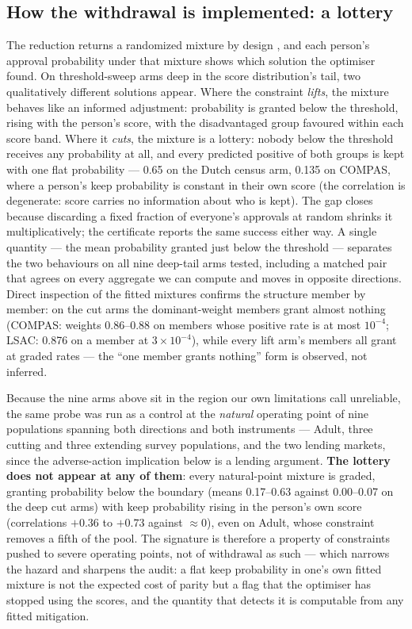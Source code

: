\documentclass[9pt,conference]{IEEEtran}
\begin{document}
\subsection{How the withdrawal is implemented: a lottery}
\label{sec:lottery}

The reduction returns a randomized mixture by design \cite{agarwal2018}, and each person's
approval probability under that mixture shows which solution the optimiser found. On
threshold-sweep arms deep in the score distribution's tail, two qualitatively different
solutions appear. Where the constraint \emph{lifts}, the mixture behaves like an informed
adjustment: probability is granted below the threshold, rising with the person's score,
with the disadvantaged group favoured within each score band. Where it \emph{cuts}, the
mixture is a lottery: nobody below the threshold receives any probability at all, and
every predicted positive of both groups is kept with one flat probability --- 0.65 on the
Dutch census arm, 0.135 on COMPAS, where a person's keep probability is constant in their
own score (the correlation is degenerate: score carries no information about who is kept). The gap closes because discarding a fixed
fraction of everyone's approvals at random shrinks it multiplicatively; the certificate
reports the same success either way. A single quantity --- the mean probability granted
just below the threshold --- separates the two behaviours on all nine deep-tail arms
tested, including a matched pair that agrees on every aggregate we can compute and moves
in opposite directions. Direct inspection of the fitted mixtures confirms the structure
member by member: on the cut arms the dominant-weight members grant almost nothing
(COMPAS: weights 0.86--0.88 on members whose positive rate is at most $10^{-4}$; LSAC:
0.876 on a member at $3 \times 10^{-4}$), while every lift arm's members all grant at
graded rates --- the ``one member grants nothing'' form is observed, not inferred.

Because the nine arms above sit in the region our own limitations call unreliable, the
same probe was run as a control at the \emph{natural} operating point of nine
populations spanning both directions and both instruments --- Adult, three cutting and
three extending survey populations, and the two lending markets, since the
adverse-action implication below is a lending argument. \textbf{The lottery does not
appear at any of them}: every natural-point
mixture is graded, granting probability below the boundary (means 0.17--0.63 against
0.00--0.07 on the deep cut arms) with keep probability rising in the person's own score
(correlations $+0.36$ to $+0.73$ against $\approx 0$), even on Adult, whose constraint
removes a fifth of the pool. The signature is therefore a property of constraints pushed
to severe operating points, not of withdrawal as such --- which narrows the hazard and
sharpens the audit: a flat keep probability in one's own fitted mixture is not the
expected cost of parity but a flag that the optimiser has stopped using the scores, and
the quantity that detects it is computable from any fitted mitigation.
\end{document}

